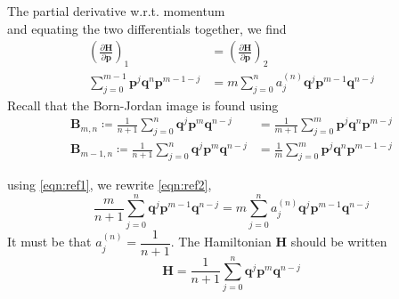 \documentclass[aspectratio=169]{beamer}
\begin{document}
\begin{frame}[allowframebreaks]{The partial derivative w.r.t. momentum}
\begin{equation}
		\end{equation}
		and equating the two differentials together, we find
		\begin{align}
			\left( \frac{\partial\textbf{H}}{\partial\textbf{p}}\right)_1&=\left( \frac{\partial\textbf{H}}{\partial\textbf{p}}\right)_2\\
			\sum_{j=0}^{m-1}\textbf{p}^j\textbf{q}^n\textbf{p}^{m-1-j}&=m\sum_{j=0}^{n}a_j^{(n)}\textbf{q}^j\textbf{p}^{m-1}\textbf{q}^{n-j}\label{eqn:ref2}
		\end{align}
		Recall that the Born-Jordan image is found using
		\begin{align}
			\textbf{B}_{m,n}\coloneqq\frac{1}{n+1}\sum_{j=0}^n\textbf{q}^j\textbf{p}^m\textbf{q}^{n-j}&=\frac{1}{m+1}\sum_{j=0}^{m}\textbf{p}^j\textbf{q}^n\textbf{p}^{m-j} \\
			\textbf{B}_{m-1,n}\coloneqq\frac{1}{n+1}\sum_{j=0}^n\textbf{q}^j\textbf{p}^m\textbf{q}^{n-j}&=\frac{1}{m}\sum_{j=0}^{m}\textbf{p}^j\textbf{q}^n\textbf{p}^{m-1-j} \label{eqn:ref1}
		\end{align}
		
		\framebreak
		using \ref{eqn:ref1}, we rewrite \ref{eqn:ref2},
		\begin{equation}
			\frac{m}{n+1}\sum_{j=0}^{n}\textbf{q}^j\textbf{p}^{m-1}\textbf{q}^{n-j}\label{eqn:ref2}=m\sum_{j=0}^{n}a_j^{(n)}\textbf{q}^j\textbf{p}^{m-1}\textbf{q}^{n-j}
		\end{equation}
		It must be that $a_j^{(n)}=\dfrac{1}{n+1}$. The Hamiltonian $\textbf{H}$ should be written
		\begin{equation}
			\textbf{H}=\frac{1}{n+1}\sum_{j=0}^n\textbf{q}^j\textbf{p}^m\textbf{q}^{n-j}
		\end{equation}
	\end{frame}
	
\end{document}
